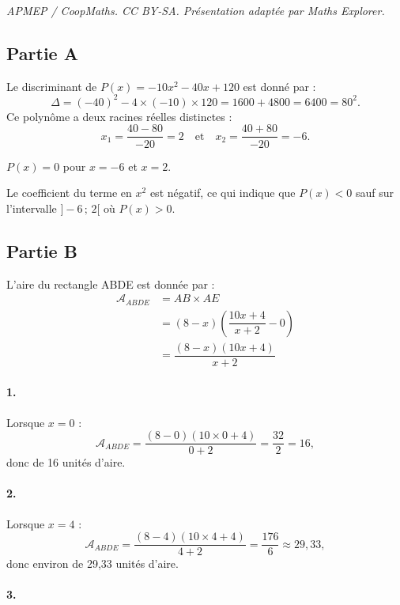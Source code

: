 \documentclass[10pt]{article}
\begin{document}
\noindent\textit{APMEP / CoopMaths. CC BY-SA. Présentation adaptée par Maths Explorer.}\par\medskip
\subsection*{Partie A}

Le discriminant de \( P(x) = -10x^2 - 40x + 120 \) est donné par :
\[
\Delta = (-40)^2 - 4 \times (-10) \times 120 = 1600 + 4800 = 6400 = 80^2.
\]
Ce polynôme a deux racines réelles distinctes :
\[
x_1 = \frac{40 - 80}{-20} = 2 \quad \text{et} \quad x_2 = \frac{40 + 80}{-20} = -6.
\]

\( P(x) = 0 \) pour \( x = -6 \) et \( x = 2 \).

Le coefficient du terme en \( x^2 \) est négatif, ce qui indique que \( P(x) < 0 \) sauf sur l'intervalle \( ]-6\,;\,2[ \) où \( P(x) > 0 \).

\subsection*{Partie B}

L'aire du rectangle ABDE est donnée par :
\begin{align*}
\mathcal{A}_{ABDE} &= AB \times AE \\
&= (8 - x)\left( \dfrac{10x + 4}{x + 2} - 0 \right) \\
&= \dfrac{(8 - x)(10x + 4)}{x + 2}
\end{align*}

\paragraph{1.} Lorsque \( x = 0 \) :
\[
\mathcal{A}_{ABDE} = \dfrac{(8 - 0)(10 \times 0 + 4)}{0 + 2} = \frac{32}{2} = 16,
\]
donc de 16 unités d'aire.

\paragraph{2.} Lorsque \( x = 4 \) :
\[
\mathcal{A}_{ABDE} = \dfrac{(8 - 4)(10 \times 4 + 4)}{4 + 2} = \frac{176}{6} \approx 29{,}33,
\]
donc environ de 29{,}33 unités d'aire.

\paragraph{3.}
\end{document}
